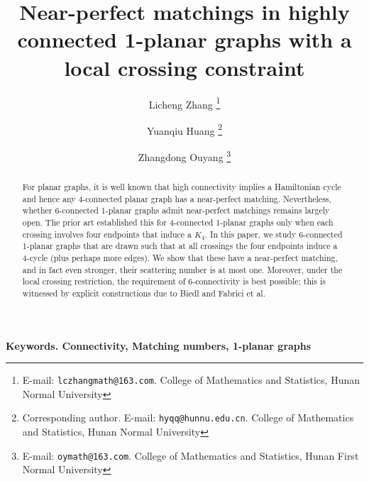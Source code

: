\documentclass[12pt,a4paper]{article}
\begin{document}
\title{\textbf{\Large Near-perfect matchings in highly connected 1-planar graphs with a local crossing constraint}}

\author{
 \normalsize  Licheng Zhang \thanks{E-mail: \texttt{lczhangmath@163.com}. College of Mathematics and Statistics, Hunan  Normal  University} \and
  \normalsize  Yuanqiu Huang \thanks{Corresponding author. E-mail: \texttt{hyqq@hunnu.edu.cn}. College of Mathematics and Statistics, Hunan  Normal  University} \and
  \normalsize Zhangdong Ouyang \thanks{ E-mail: \texttt{oymath@163.com}. College of Mathematics and Statistics, Hunan First Normal   University }
}

\date{}
\maketitle

\noindent
\begin{abstract}
 For planar graphs, it is well known that high connectivity implies a Hamiltonian cycle and hence any 4-connected planar graph has a near-perfect matching.   Nevertheless, whether 6-connected 1-planar graphs admit near-perfect matchings remains largely open. The prior art established this for 4-connected 1-planar graphs only when each crossing involves four endpoints that induce a $K_4$.
In this paper, we study  6-connected 1-planar graphs that are drawn such that at all crossings the four endpoints induce a 4-cycle (plus perhaps more edges). We show that these have a near-perfect matching, and in fact even stronger, their scattering number is at most one. Moreover, under the local crossing restriction, the requirement of 6-connectivity is best possible; this is witnessed by explicit constructions due to Biedl and Fabrici et al.


\end{abstract}
\noindent
\textbf{Keywords. Connectivity, Matching numbers,   1-planar graphs }
\end{document}
